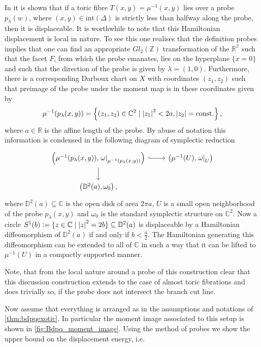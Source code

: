 \documentclass[12pt,a4paper,draft]{scrartcl}
\begin{document}
In \cite[Lemma 2.4.]{mcduff2011displacing} it is shown that if a toric fibre $T(x,y)=\mu^{-1}(x,y)$ lies over a probe $p_\lambda(w)$, where $(x,y)\in \text{int}(\Delta)$ is strictly less than halfway along the probe, then it is displaceable.
It is worthwhile to note that this Hamiltonian displacement is local in nature.
To see this one realises that the definition probes implies that one can find an appropriate $Gl_2(\mathbb{Z})$ transformation of the $\mathbb{R^2}$ such that the facet $F$, from which the probe emanates, lies on the hyperplane $\{x=0\}$ and such that the direction of the probe is given by $\lambda=(1,0)$.
Furthermore, there is a corresponding Darboux chart on $X$ with coordinates $(z_1,z_2)$ such that preimage of the probe under the moment map is in these coordinates given by
\begin{equation*}
  \mu^{-1}(p_\lambda(x,y))=\left\{(z_1,z_2)\in \mathbb{C}^2 \mid \abs{z_1}^2<2a, \abs{z_2}=\text{const.}\right\},
\end{equation*}
where $a \in \mathbb{R}$ is the affine length of the probe.
By abuse of notation this information is condensed in the following diagram of symplectic reduction
\[
\begin{tikzcd}
  \left(\mu^{-1}(p_\lambda(x,y)),\left.\omega\right|_{\mu^{-1}(p_\lambda(x,y))}\right)\ar[r,hook]\ar[d]&
  \left(\mu^{-1}(U),\left.\omega\right|_U\right)
  \\
  \left(\mathbb{D}^2(a),\omega_0\right),
\end{tikzcd}
\]
where $\mathbb{D}^2(a)\subseteq \mathbb{C}$ is the open disk of area $2\pi a$, $U$ is a small open neighborhood of the probe $p_\lambda(x,y)$ and $\omega_0$ is the standard symplectic structure on $\mathbb{C}^2$.
Now a circle $S^1(b)\vcentcolon=\{z\in \mathbb{C}\mid \abs{z}^2=2b\} \subseteq \mathbb{D}^2(a)$ is displaceable by a Hamiltonian diffeomorphism of $\mathbb{D}^2(a)$ if and only if $b<\frac{a}{2}$.
The Hamiltonian generating this diffeomorphism can be extended to all of $\mathbb{C}$ in such a way that it can be lifted to $\mu^{-1}(U)$ in a compactly supported manner.

Note, that from the local nature around a probe of this construction clear that this discussion construction extends to the case of almost toric fibrations and does trivially so, if the probe does not intersect the branch cut line.

Now assume that everything is arranged as in the assumptions and notations of \cref{thm:bdpqexotic}.
In particular the moment image associated to this setup is shown in \cref{fig:Bdpq_moment_image}.
Using the method of probes we show the upper bound on the displacement energy, i.e.
\end{document}
